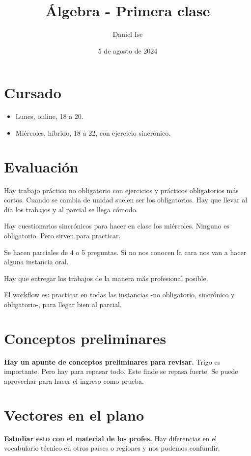 \documentclass{article}
\title{Álgebra - Primera clase}
\author{Daniel Ise}
\date{5 de agosto de 2024}
\begin{document}
\maketitle

\section*{Cursado}

\begin{itemize}
    \item Lunes, online, 18 a 20.
    \item Miércoles, híbrido, 18 a 22, con ejercicio sincrónico.
\end{itemize}

\section*{Evaluación}

Hay trabajo práctico no obligatorio con ejercicios y prácticos obligatorios
más cortos. Cuando se cambia de unidad suelen ser los obligatorios. Hay que
llevar al día los trabajos y al parcial se llega cómodo.

Hay cuestionarios sincrónicos para hacer en clase los miércoles.
Ninguno es obligatorio. Pero sirven para practicar.

Se hacen parciales de 4 o 5 preguntas. Si no nos conocen la cara nos van a
hacer alguna instancia oral.

Hay que entregar los trabajos de la manera más profesional posible.

El workflow es: practicar en todas las instancias -no obligatorio, sincrónico y
obligatorio-, para llegar bien al parcial.

\section*{Conceptos preliminares}

\textbf{Hay un apunte de conceptos preliminares para revisar.} Trigo es
importante. Pero hay para repasar todo. Este finde se repasa fuerte. Se puede
aprovechar para hacer el ingreso como prueba.

\section*{Vectores en el plano}

\textbf{Estudiar esto con el material de los profes.} Hay diferencias
en el vocabulario técnico en otros países o regiones y nos podemos confundir.
\end{document}
